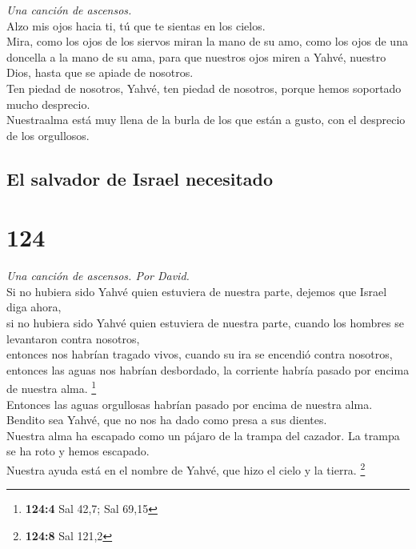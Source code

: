 \emph{Una canción de ascensos.}\\
 Alzo mis ojos hacia ti, tú que te sientas en los
cielos.\\
 Mira, como los ojos de los siervos miran la mano de su
amo, como los ojos de una doncella a la mano de su ama, para que
nuestros ojos miren a Yahvé, nuestro Dios, hasta que se apiade de
nosotros.\\
 Ten piedad de nosotros, Yahvé, ten piedad de nosotros,
porque hemos soportado mucho desprecio.\\
 Nuestraalma está muy llena de la burla de los que están a
gusto, con el desprecio de los orgullosos.

\hypertarget{el-salvador-de-israel-necesitado}{%
\subsection{El salvador de Israel
necesitado}\label{el-salvador-de-israel-necesitado}}

\hypertarget{section-121}{%
\section{124}\label{section-121}}

\emph{Una canción de ascensos. Por David.}\\
 Si no hubiera sido Yahvé quien estuviera de nuestra
parte, dejemos que Israel diga ahora,\\
 si no hubiera sido Yahvé quien estuviera de nuestra
parte, cuando los hombres se levantaron contra nosotros,\\
 entonces nos habrían tragado vivos, cuando su ira se
encendió contra nosotros,\\
 entonces las aguas nos habrían desbordado, la corriente
habría pasado por encima de nuestra alma. \footnote{\textbf{124:4} Sal
  42,7; Sal 69,15}\\
 Entonces las aguas orgullosas habrían pasado por encima
de nuestra alma.\\
 Bendito sea Yahvé, que no nos ha dado como presa a sus
dientes.\\
 Nuestra alma ha escapado como un pájaro de la trampa del
cazador. La trampa se ha roto y hemos escapado.\\
 Nuestra ayuda está en el nombre de Yahvé, que hizo el
cielo y la tierra. \footnote{\textbf{124:8} Sal 121,2}

